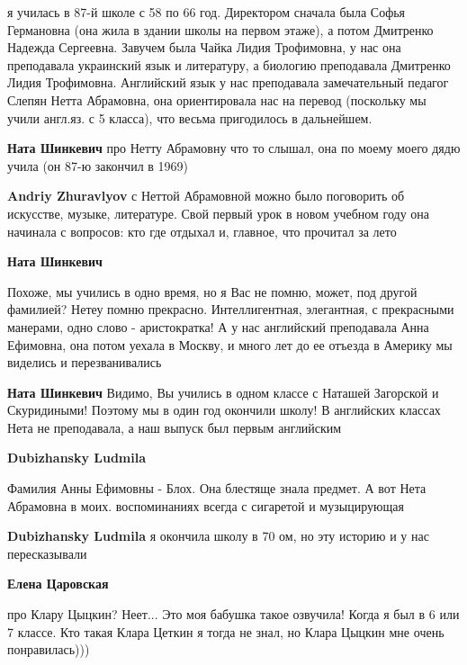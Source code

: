 \begin{itemize}
\begin{itemize}

я училась в 87-й школе с 58 по 66 год. Директором сначала была Софья Германовна
(она жила в здании школы на первом этаже), а потом Дмитренко Надежда Сергеевна.
Завучем была Чайка Лидия Трофимовна, у нас она преподавала украинский язык и
литературу, а биологию преподавала Дмитренко Лидия Трофимовна. Английский язык
у нас преподавала замечательный педагог Слепян Нетта Абрамовна, она
ориентировала нас на перевод (поскольку мы учили англ.яз. с 5 класса), что
весьма пригодилось в дальнейшем.

\begin{itemize} %
\textbf{Ната Шинкевич} про Нетту Абрамовну что то слышал, она по моему моего дядю учила (он 87-ю закончил в 1969)

\textbf{Andriy Zhuravlyov} с Неттой Абрамовной можно было поговорить об искусстве, музыке, литературе. Свой первый урок в новом учебном году она начинала с вопросов: кто где отдыхал и, главное, что прочитал за лето

\textbf{Ната Шинкевич} 

Похоже, мы учились в одно время, но я Вас не помню, может, под другой фамилией?
Нетеу помню прекрасно. Интеллигентная, элегантная, с прекрасными манерами, одно
слово - аристократка! А у нас английский преподавала Анна Ефимовна, она потом
уехала в Москву, и много лет до ее отъезда в Америку мы виделись и
перезванивались


\textbf{Ната Шинкевич} Видимо, Вы учились в одном классе с Наташей Загорской и Скуридиными! Поэтому мы в один год окончили школу! В английских классах Нета не преподавала, а наш выпуск был первым английским

\textbf{Dubizhansky Ludmila} 

Фамилия Анны Ефимовны - Блох. Она блестяще знала предмет. А вот Нета Абрамовна
в моих. воспоминаниях всегда с сигаретой и музыцирующая

\end{itemize} %

\textbf{Dubizhansky Ludmila} я окончила школу в 70 ом, но эту историю и у нас пересказывали

\begin{itemize} %
\textbf{Елена Царовская} 

про Клару Цыцкин? Неет... Это моя бабушка такое озвучила! Когда я был в 6 или 7
классе. Кто такая Клара Цеткин я тогда не знал, но Клара Цыцкин мне очень
понравилась)))


\end{itemize}
\end{itemize}
\end{itemize}
